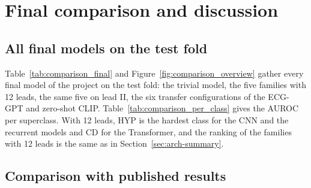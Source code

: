 \section{Final comparison and discussion}\label{sec:discussion}

\subsection{All final models on the test fold}

Table~\ref{tab:comparison_final} and Figure~\ref{fig:comparison_overview} gather every final model of the
project on the test fold: the trivial model, the five families with 12 leads, the same five on lead II,
the six transfer configurations of the ECG-GPT and zero-shot CLIP. Table~\ref{tab:comparison_per_class}
gives the AUROC per superclass. With 12 leads, HYP is the hardest class for the CNN and the recurrent
models and CD for the Transformer, and the ranking of the families with 12 leads is the same as in Section~\ref{sec:arch-summary}.




\subsection{Comparison with published results}

